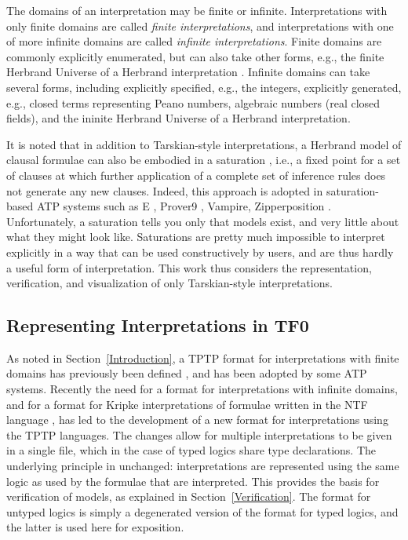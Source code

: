 \documentclass[letterpaper]{article}
\begin{document}
The domains of an interpretation may be finite or infinite.
Interpretations with only finite domains are called {\em finite interpretations}, and
interpretations with one of more infinite domains are called {\em infinite interpretations}.
Finite domains are commonly explicitly enumerated, but can also take other forms, e.g., the 
finite Herbrand Universe of a Herbrand interpretation \cite{Her30}.
Infinite domains can take several forms, including explicitly specified, e.g., the integers,
explicitly generated, e.g., closed terms representing Peano numbers, algebraic numbers (real
closed fields), and the ininite Herbrand Universe of a Herbrand interpretation.

It is noted that in addition to Tarskian-style interpretations, a Herbrand model of clausal 
formulae can also be embodied in a saturation \cite{BG+01}, i.e., a fixed point for a set of 
clauses at which further application of a complete set of inference rules does not generate 
any new clauses.
Indeed, this approach is adopted in saturation-based ATP systems such as E \cite{SCV19}, 
Prover9 \cite{McC-Prover9-URL}, Vampire, Zipperposition \cite{VB+21}.
Unfortunately, a saturation tells you only that models exist, and very little about what they 
might look like. 
Saturations are pretty much impossible to interpret explicitly in a way that can be used 
constructively by users, and are thus hardly a useful form of interpretation.
This work thus considers the representation, verification, and visualization of only 
Tarskian-style interpretations.

 
\subsection{Representing Interpretations in TF0}
\label{InterpretationsTF0}

As noted in Section~\ref{Introduction}, a TPTP format for interpretations with finite domains 
has previously been defined \cite{SS+06}, and has been adopted by some ATP systems.
Recently the need for a format for interpretations with infinite domains, and for a format for 
Kripke interpretations \cite{Kri63} of formulae written in the NTF language \cite{SF+22}, has 
led to the development of a new format for interpretations using the TPTP languages.
The changes allow for multiple interpretations to be given in a single file, which in the case
of typed logics share type declarations.
The underlying principle in unchanged: interpretations are represented using the same logic
as used by the formulae that are interpreted.
This provides the basis for verification of models, as explained in Section~\ref{Verification}.
The format for untyped logics is simply a degenerated version of the format for typed logics, 
and the latter is used here for exposition.
\end{document}
